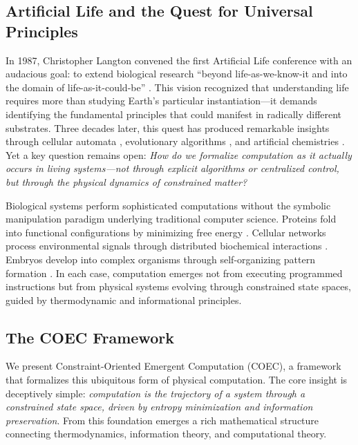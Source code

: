 \documentclass[11pt]{article}
\begin{document}
\subsection{Artificial Life and the Quest for Universal Principles}

In 1987, Christopher Langton convened the first Artificial Life conference with an audacious goal: to extend biological research ``beyond life-as-we-know-it and into the domain of life-as-it-could-be'' \citep{langton1989artificial}. This vision recognized that understanding life requires more than studying Earth's particular instantiation—it demands identifying the fundamental principles that could manifest in radically different substrates. Three decades later, this quest has produced remarkable insights through cellular automata \citep{wolfram2002new}, evolutionary algorithms \citep{holland1992adaptation}, and artificial chemistries \citep{dittrich2001artificial}. Yet a key question remains open: \textit{How do we formalize computation as it actually occurs in living systems—not through explicit algorithms or centralized control, but through the physical dynamics of constrained matter?}

Biological systems perform sophisticated computations without the symbolic manipulation paradigm underlying traditional computer science. Proteins fold into functional configurations by minimizing free energy \citep{anfinsen1973principles}. Cellular networks process environmental signals through distributed biochemical interactions \citep{alon2006introduction}. Embryos develop into complex organisms through self-organizing pattern formation \citep{turing1952chemical}. In each case, computation emerges not from executing programmed instructions but from physical systems evolving through constrained state spaces, guided by thermodynamic and informational principles.

\subsection{The COEC Framework}

We present Constraint-Oriented Emergent Computation (COEC), a framework that formalizes this ubiquitous form of physical computation. The core insight is deceptively simple: \textit{computation is the trajectory of a system through a constrained state space, driven by entropy minimization and information preservation}. From this foundation emerges a rich mathematical structure connecting thermodynamics, information theory, and computational theory.
\end{document}
